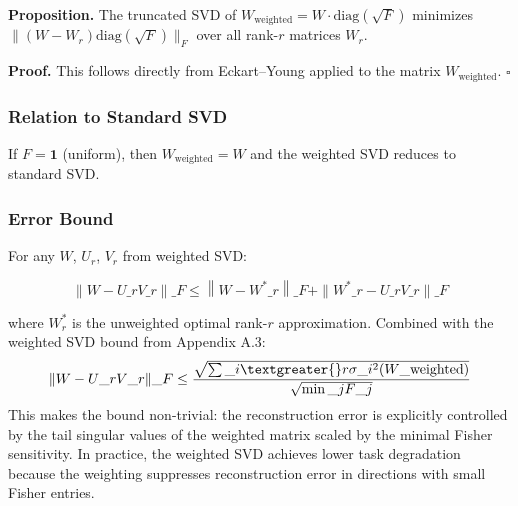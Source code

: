 \textbf{Proposition.} The truncated SVD of $W_\text{weighted} = W \cdot \mathrm{diag}(\sqrt{F})$ 
minimizes $\|(W - W_r) \mathrm{diag}(\sqrt{F})\|_F$ over all rank-$r$ matrices 
$W_r$.

\textbf{Proof.} This follows directly from Eckart--Young applied to the matrix 
$W_\text{weighted}$. $\square$

\subsubsection{Relation to Standard SVD}

If $F = \mathbf{1}$ (uniform), then $W_\text{weighted} = W$ and the weighted 
SVD reduces to standard SVD.

\subsubsection{Error Bound}

For any $W$, $U_r$, $V_r$ from weighted SVD:

\[
\|W - U\_r V\_r\|\_F \leq \left\|W - W^*\_r\right\|\_F + \|W^*\_r - U\_r V\_r\|\_F
\tag{4.14}
\]

where $W^*_r$ is the unweighted optimal rank-$r$ approximation. Combined with the weighted SVD bound from Appendix A.3:
\[
\|W - U\_r V\_r\|\_F \leq \frac{\sqrt{\sum\_{i \textgreater{} r} \sigma\_i^2(W\_\text{weighted})}}{\sqrt{\min\_j F\_j}}
\]
This makes the bound non-trivial: the reconstruction error is explicitly controlled by the tail singular values of the weighted matrix scaled by the minimal Fisher sensitivity. In practice, the weighted SVD achieves lower task degradation because the weighting suppresses reconstruction error in directions with small Fisher entries.